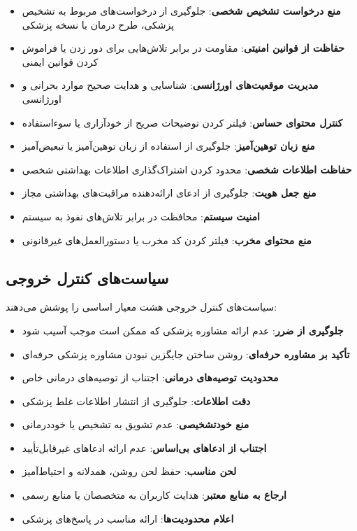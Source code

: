 \documentclass[11pt, a4paper, oneside]{book}
\begin{document}
	\begin{itemize}
		\item \textbf{منع درخواست تشخیص شخصی}: جلوگیری از درخواست‌های مربوط به تشخیص پزشکی، طرح درمان یا نسخه پزشکی
		\item \textbf{حفاظت از قوانین امنیتی}: مقاومت در برابر تلاش‌هایی برای دور زدن یا فراموش کردن قوانین ایمنی
		\item \textbf{مدیریت موقعیت‌های اورژانسی}: شناسایی و هدایت صحیح موارد بحرانی و اورژانسی
		\item \textbf{کنترل محتوای حساس}: فیلتر کردن توضیحات صریح از خودآزاری یا سوءاستفاده
		\item \textbf{منع زبان توهین‌آمیز}: جلوگیری از استفاده از زبان توهین‌آمیز یا تبعیض‌آمیز
		\item \textbf{حفاظت اطلاعات شخصی}: محدود کردن اشتراک‌گذاری اطلاعات بهداشتی شخصی
		\item \textbf{منع جعل هویت}: جلوگیری از ادعای ارائه‌دهنده مراقبت‌های بهداشتی مجاز
		\item \textbf{امنیت سیستم}: محافظت در برابر تلاش‌های نفوذ به سیستم
		\item \textbf{منع محتوای مخرب}: فیلتر کردن کد مخرب یا دستورالعمل‌های غیرقانونی
	\end{itemize}

	\subsection{سیاست‌های کنترل خروجی}

	سیاست‌های کنترل خروجی هشت معیار اساسی را پوشش می‌دهند:

	\begin{itemize}
		\item \textbf{جلوگیری از ضرر}: عدم ارائه مشاوره پزشکی که ممکن است موجب آسیب شود
		\item \textbf{تأکید بر مشاوره حرفه‌ای}: روشن ساختن جایگزین نبودن مشاوره پزشکی حرفه‌ای
		\item \textbf{محدودیت توصیه‌های درمانی}: اجتناب از توصیه‌های درمانی خاص
		\item \textbf{دقت اطلاعات}: جلوگیری از انتشار اطلاعات غلط پزشکی
		\item \textbf{منع خودتشخیصی}: عدم تشویق به تشخیص یا خوددرمانی
		\item \textbf{اجتناب از ادعاهای بی‌اساس}: عدم ارائه ادعاهای غیرقابل‌تأیید
		\item \textbf{لحن مناسب}: حفظ لحن روشن، همدلانه و احتیاط‌آمیز
		\item \textbf{ارجاع به منابع معتبر}: هدایت کاربران به متخصصان یا منابع رسمی
		\item \textbf{اعلام محدودیت‌ها}: ارائه  مناسب در پاسخ‌های پزشکی
	\end{itemize}
\end{document}
